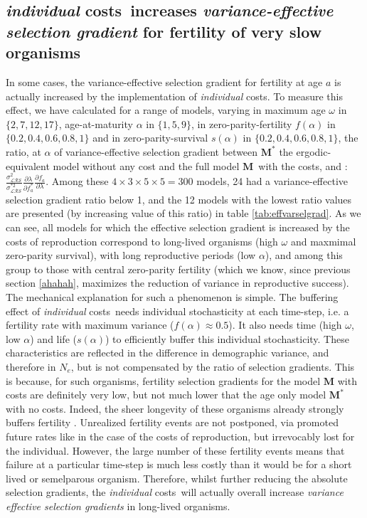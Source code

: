 \documentclass[10pt,a4paper]{article}
\newcommand{\M}{$\mathbf{M}$}
\newcommand{\PCoR}{\emph{individual} costs}
\begin{document}
{\subsection{\PCoR\ increases \emph{variance-effective selection gradient} for fertility of very slow organisms}
\label{sec:PCORincVarEffSelGrad_of_slow_org}
In some cases, the variance-effective selection gradient for fertility at age $a$ is actually increased by the implementation of \PCoR.  
To measure this effect, we have calculated for a range of models, varying in maximum age $\omega$ in $\lbrace2,7,12,17\rbrace$, age-at-maturity $\alpha$ in $\lbrace 1,5,9\rbrace$, in zero-parity-fertility $f(\alpha)$ in $\lbrace 0.2,0.4,0.6,0.8,1\rbrace$ and in zero-parity-survival $s(\alpha)$ in $\lbrace 0.2,0.4,0.6,0.8,1\rbrace$, the ratio, at $\alpha$ of variance-effective selection gradient between $\mathbf{M^{*}}$ the ergodic-equivalent model without any cost and the full model \M\ with the costs, and : $\frac{\sigma^{2}_{\mathcal{LRS}}}{\sigma^{*2}_{\mathcal{LRS}}}\frac{\partial \lambda}{\partial f^{*}_{a}}\frac{\partial f_{a} }{\partial \lambda }$. Among these $4 \times 3 \times 5\times 5=300$ models, 24 had a 
variance-effective selection gradient ratio below 1, and the 12 models with the lowest ratio values are presented (by increasing value of this ratio) in table \ref{tab:effvarselgrad}. As we can see, all models for which the effective selection gradient is increased by the costs of reproduction correspond to long-lived organisms (high $\omega$ and maxmimal zero-parity survival), with long reproductive periods (low $\alpha$), and among this group to those with central zero-parity fertility (which we know, since previous section \ref{ahahah}, maximizes the reduction of variance in reproductive success). \\

The mechanical explanation for such a phenomenon is simple. The buffering effect of \PCoR\ needs individual stochasticity at each time-step, i.e. a fertility rate with maximum variance ($f(\alpha) \approx 0.5$). It also needs time (high $\omega$, low $\alpha$) and life ($s(\alpha)$) to efficiently buffer this individual stochasticity. These characteristics are reflected in the difference in demographic variance, and therefore in $N_{e}$, but is not compensated by the ratio of selection gradients. This is because, for such organisms, fertility selection gradients for the model $\mathbf{M}$ with costs are definitely very low, but not much lower that the age only model $\mathbf{M^{*}}$ with no costs. Indeed, the sheer longevity of these organisms already strongly buffers fertility \citep{Morris2008}. Unrealized fertility events are not postponed, via promoted future rates like in the case of the costs of reproduction, but irrevocably lost for the individual. However, the large number of these fertility events means that failure at a particular time-step is much less costly  than it would be for a short lived or semelparous organism. Therefore, whilst further reducing the absolute selection gradients, the \PCoR\ will actually overall increase \emph{variance effective selection gradients} in long-lived organisms.\\


}
\end{document}
